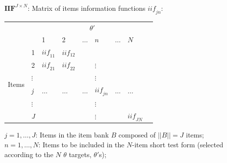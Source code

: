 \documentclass[aspectratio=149, compress]{beamer}
\begin{document}
\begin{frame}
	\vspace*{-1mm}
	\small
	$\mathbf{IIF}^{J\times N}$: Matrix of items information functions $\mathit{iif}_{jn}$:
	\vspace*{-1mm}
	\begin{center}
		\begin{tabular}{p{0.7cm}  p{0.7cm}  |p{0.7cm}  p{0.7cm} p{0.7cm} p{0.7cm} p{0.7cm} p{0.7cm} | p{0.7cm}}
			& \multicolumn{1}{l}{} & \multicolumn{6}{c}{$\theta'$} & \multicolumn{1}{c}{} \\
			& \multicolumn{1}{c}{} & \multicolumn{1}{l}{1} & \multicolumn{1}{l}{2} & \multicolumn{1}{l}{$\ldots$} & 
			\multicolumn{1}{l}{$n$} & \multicolumn{1}{l}{$\ldots$} & \multicolumn{1}{l}{$N$}& \multicolumn{1}{l}{} \\
			\cline{3-8}
			\multirow{8}{*}{Items} & 1 & $\mathit{iif}_{11}$ & $iif_{12}$ & & &  &  &  \\
			&	2& $\mathit{iif}_{21}$ & $\mathit{iif}_{22}$ & & $\vdots$ & &  &  \\
			&	$\vdots$ &  &  &  & $\vdots$   &  &  & \\
			&\emph{j}& $\ldots$ & $\ldots$ & $\ldots$ & $\mathit{iif}_{jn}$ & $\ldots$ & $\ldots$ &  \\
			&$\vdots$	&  &  &  & $\vdots$   &  &  &  \\
			&	\emph{J} &  &  & & $\vdots$ &  & $\mathit{iif}_{JN}$ &  \multicolumn{1}{c}{}\\
			\cline{3-8}
		\end{tabular}
	\end{center}
	$j = 1, \ldots, J$: Items in the item bank $B$ composed of $||B|| = J$ items;\\
	$n = 1, \ldots, N$: Items to be included in the $N$-item short test form (selected according to the $N$ $\theta$ targets, $\theta'$s);\\	
\end{frame}
\end{document}
